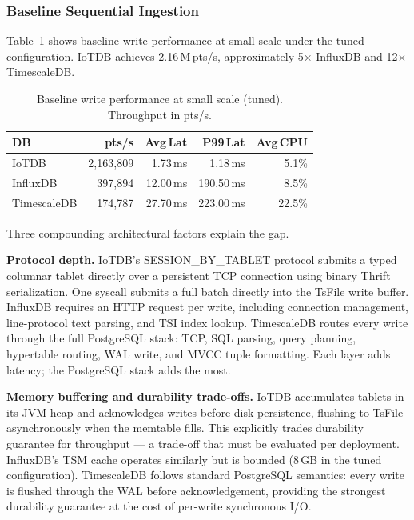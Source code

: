 \subsubsection{Baseline Sequential Ingestion}

Table~\ref{tab:write-baseline} shows baseline write performance at small scale under the tuned
configuration. IoTDB achieves 2.16\,M\,pts/s, approximately 5$\times$ InfluxDB and 12$\times$
TimescaleDB.

\begin{table}[ht]
  \centering
  \caption{Baseline write performance at small scale (tuned). Throughput in pts/s.}
  \label{tab:write-baseline}
  \begin{tabular}{lrrrr}
    \hline
    \textbf{DB} & \textbf{pts/s} & \textbf{Avg\,Lat} & \textbf{P99\,Lat} & \textbf{Avg\,CPU} \\
    \hline
    IoTDB       & 2{,}163{,}809 &  1.73\,ms &   1.18\,ms &  5.1\% \\
    InfluxDB    &   397{,}894   & 12.00\,ms & 190.50\,ms &  8.5\% \\
    TimescaleDB &   174{,}787   & 27.70\,ms & 223.00\,ms & 22.5\% \\
    \hline
  \end{tabular}
\end{table}

Three compounding architectural factors explain the gap.

\textbf{Protocol depth.} IoTDB's SESSION\_BY\_TABLET protocol submits a typed columnar
tablet directly over a persistent TCP connection using binary Thrift serialization. One
syscall submits a full batch directly into the TsFile write buffer. InfluxDB requires an
HTTP request per write, including connection management, line-protocol text parsing, and
TSI index lookup. TimescaleDB routes every write through the full PostgreSQL stack:
TCP, SQL parsing, query planning, hypertable routing, WAL write, and MVCC tuple formatting.
Each layer adds latency; the PostgreSQL stack adds the most.

\textbf{Memory buffering and durability trade-offs.} IoTDB accumulates tablets in its
JVM heap and acknowledges writes before disk persistence, flushing to TsFile asynchronously
when the memtable fills. This explicitly trades durability guarantee for throughput --- a
trade-off that must be evaluated per deployment. InfluxDB's TSM cache operates similarly
but is bounded (8\,GB in the tuned configuration). TimescaleDB follows standard PostgreSQL
semantics: every write is flushed through the WAL before acknowledgement, providing the
strongest durability guarantee at the cost of per-write synchronous I/O.

